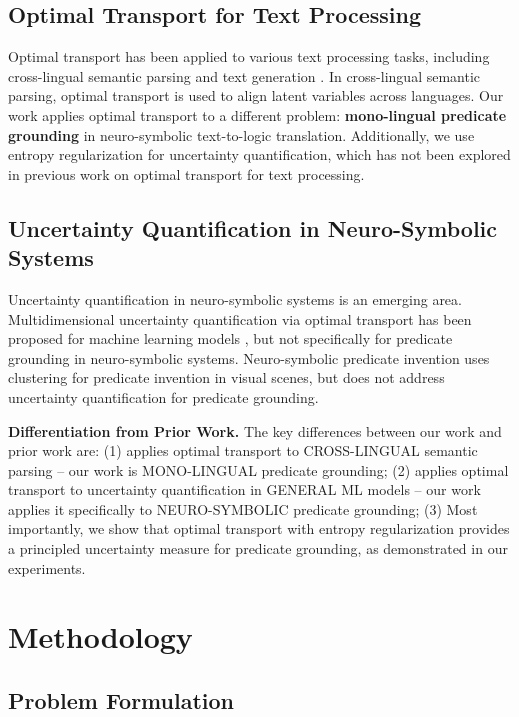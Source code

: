 \documentclass[11pt,letterpaper]{article}
\begin{document}
\subsection{Optimal Transport for Text Processing}

Optimal transport has been applied to various text processing tasks, including cross-lingual semantic parsing \cite{Sherborne2023} and text generation \cite{Chen2023}. In cross-lingual semantic parsing, optimal transport is used to align latent variables across languages. Our work applies optimal transport to a different problem: \textbf{mono-lingual predicate grounding} in neuro-symbolic text-to-logic translation. Additionally, we use entropy regularization for uncertainty quantification, which has not been explored in previous work on optimal transport for text processing.

\subsection{Uncertainty Quantification in Neuro-Symbolic Systems}

Uncertainty quantification in neuro-symbolic systems is an emerging area. Multidimensional uncertainty quantification via optimal transport has been proposed for machine learning models \cite{Kotelevskii2025}, but not specifically for predicate grounding in neuro-symbolic systems. Neuro-symbolic predicate invention \cite{Sha2024} uses clustering for predicate invention in visual scenes, but does not address uncertainty quantification for predicate grounding.

\textbf{Differentiation from Prior Work.} The key differences between our work and prior work are: (1) \cite{Sherborne2023} applies optimal transport to CROSS-LINGUAL semantic parsing -- our work is MONO-LINGUAL predicate grounding; (2) \cite{Kotelevskii2025} applies optimal transport to uncertainty quantification in GENERAL ML models -- our work applies it specifically to NEURO-SYMBOLIC predicate grounding; (3) Most importantly, we show that optimal transport with entropy regularization provides a principled uncertainty measure for predicate grounding, as demonstrated in our experiments.

\section{Methodology}

\subsection{Problem Formulation}
\end{document}
